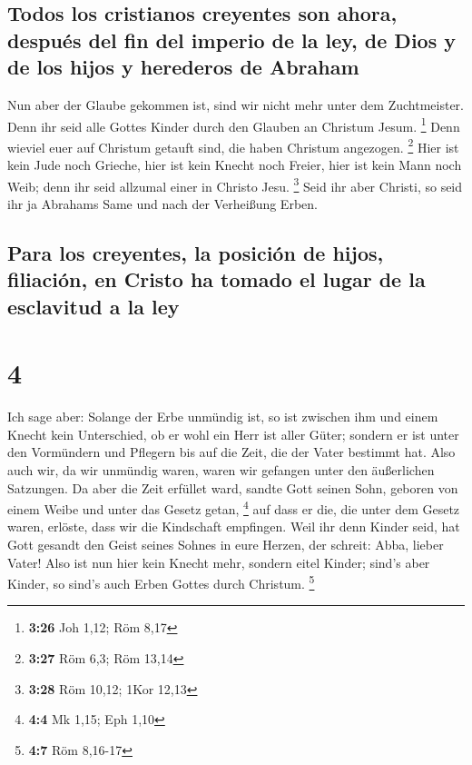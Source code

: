 \hypertarget{todos-los-cristianos-creyentes-son-ahora-despuuxe9s-del-fin-del-imperio-de-la-ley-de-dios-y-de-los-hijos-y-herederos-de-abraham}{%
\subsection{Todos los cristianos creyentes son ahora, después del fin
del imperio de la ley, de Dios y de los hijos y herederos de
Abraham}\label{todos-los-cristianos-creyentes-son-ahora-despuuxe9s-del-fin-del-imperio-de-la-ley-de-dios-y-de-los-hijos-y-herederos-de-abraham}}

 Nun aber der Glaube gekommen ist, sind wir nicht mehr
unter dem Zuchtmeister.  Denn ihr seid alle Gottes Kinder
durch den Glauben an Christum Jesum. \footnote{\textbf{3:26} Joh 1,12;
  Röm 8,17}  Denn wieviel euer auf Christum getauft sind,
die haben Christum angezogen. \footnote{\textbf{3:27} Röm 6,3; Röm 13,14}
 Hier ist kein Jude noch Grieche, hier ist kein Knecht
noch Freier, hier ist kein Mann noch Weib; denn ihr seid allzumal einer
in Christo Jesu. \footnote{\textbf{3:28} Röm 10,12; 1Kor 12,13}
 Seid ihr aber Christi, so seid ihr ja Abrahams Same und
nach der Verheißung Erben.

\hypertarget{para-los-creyentes-la-posiciuxf3n-de-hijos-filiaciuxf3n-en-cristo-ha-tomado-el-lugar-de-la-esclavitud-a-la-ley}{%
\subsection{Para los creyentes, la posición de hijos, filiación, en
Cristo ha tomado el lugar de la esclavitud a la
ley}\label{para-los-creyentes-la-posiciuxf3n-de-hijos-filiaciuxf3n-en-cristo-ha-tomado-el-lugar-de-la-esclavitud-a-la-ley}}

\hypertarget{section-3}{%
\section{4}\label{section-3}}

 Ich sage aber: Solange der Erbe unmündig ist, so ist
zwischen ihm und einem Knecht kein Unterschied, ob er wohl ein Herr ist
aller Güter;  sondern er ist unter den Vormündern und
Pflegern bis auf die Zeit, die der Vater bestimmt hat. 
Also auch wir, da wir unmündig waren, waren wir gefangen unter den
äußerlichen Satzungen.  Da aber die Zeit erfüllet ward,
sandte Gott seinen Sohn, geboren von einem Weibe und unter das Gesetz
getan, \footnote{\textbf{4:4} Mk 1,15; Eph 1,10}  auf dass
er die, die unter dem Gesetz waren, erlöste, dass wir die Kindschaft
empfingen.  Weil ihr denn Kinder seid, hat Gott gesandt
den Geist seines Sohnes in eure Herzen, der schreit: Abba, lieber Vater!
 Also ist nun hier kein Knecht mehr, sondern eitel Kinder;
sind's aber Kinder, so sind's auch Erben Gottes durch Christum.
\footnote{\textbf{4:7} Röm 8,16-17}

